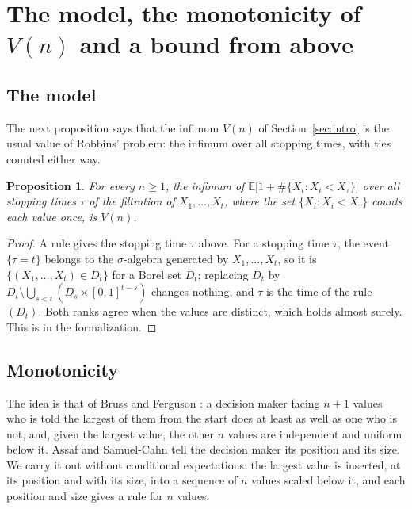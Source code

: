 \documentclass[11pt]{amsart}
\newtheorem{proposition}[theorem]{Proposition}
\theoremstyle{definition}
\numberwithin{equation}{section}
\newcommand{\lean}[1]{\ignorespaces}
\newcommand{\E}{\mathbb{E}}
\begin{document}
\appendix
\section{\texorpdfstring{The model, the monotonicity of $V(n)$ and a bound from above}{The model, the monotonicity of V(n) and a bound from above}}\label{app:mono}

\subsection{The model}
The next proposition says that the infimum $V(n)$ of Section~\ref{sec:intro} is the usual value of Robbins' problem: the infimum over all stopping times, with ties counted either way.

\begin{proposition}\label{prop:model}\lean{Robbins.robbinsValue_eq_v}
For every $n\ge1$, the infimum of $\E\bigl[1+\#\{X_i:X_i<X_\tau\}\bigr]$ over all stopping times $\tau$ of the filtration of $X_1,\dots,X_t$, where the set $\{X_i:X_i<X_\tau\}$ counts each value once, is $V(n)$.
\end{proposition}

\begin{proof}
A rule gives the stopping time $\tau$ above. For a stopping time $\tau$, the event $\{\tau=t\}$ belongs to the $\sigma$-algebra generated by $X_1,\dots,X_t$, so it is $\{(X_1,\dots,X_t)\in D_t\}$ for a Borel set $D_t$; replacing $D_t$ by $D_t\setminus\bigcup_{s<t}(D_s\times[0,1]^{t-s})$ changes nothing, and $\tau$ is the time of the rule $(D_t)$. Both ranks agree when the values are distinct, which holds almost surely. This is  in the formalization.
\end{proof}

\subsection{Monotonicity}
The idea is that of Bruss and Ferguson \cite[Theorem~2]{BF93}: a decision maker facing $n+1$ values who is told the largest of them from the start does at least as well as one who is not, and, given the largest value, the other $n$ values are independent and uniform below it. Assaf and Samuel-Cahn \cite[Theorems~2.4 and~3.1]{AS96} tell the decision maker its position and its size. We carry it out without conditional expectations: the largest value is inserted, at its position and with its size, into a sequence of $n$ values scaled below it, and each position and size gives a rule for $n$ values.
\end{document}
